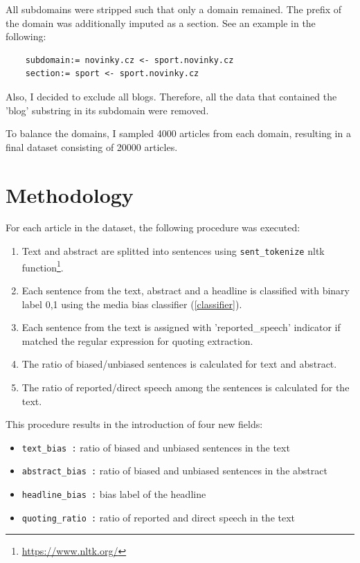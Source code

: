 All subdomains were stripped such that only a domain remained. The prefix of the domain was additionally imputed as a section. See an example in the following:
\begin{verbatim}
    subdomain:= novinky.cz <- sport.novinky.cz 
    section:= sport <- sport.novinky.cz
\end{verbatim}

Also, I decided to exclude all blogs. Therefore, all the data that contained the 'blog' substring in its subdomain were removed.

To balance the domains, I sampled 4000 articles from each domain, resulting in a final dataset consisting of 20000 articles.


\section{Methodology}
For each article in the dataset, the following procedure was executed:
\begin{enumerate}
    \item Text and abstract are splitted into sentences using \verb|sent_tokenize| nltk function\footnote{\url{https://www.nltk.org/}}.
    \item Each sentence from the text, abstract and a headline is classified with binary label 0,1 using the media bias classifier (\ref{classifier}).
    \item Each sentence from the text is assigned with 'reported\_speech' indicator if matched the regular expression for quoting extraction. 
    \item The ratio of biased/unbiased sentences is calculated for text and abstract.
    \item The ratio of reported/direct speech among the sentences is calculated for the text.
\end{enumerate}

This procedure results in the introduction of four new fields:
\begin{itemize}
    \item \verb|text_bias :| ratio of biased and unbiased sentences in the text
    \item \verb|abstract_bias :| ratio of biased and unbiased sentences in the abstract
    \item \verb|headline_bias :| bias label of the headline
    \item \verb|quoting_ratio :| ratio of reported and direct speech in the text     
\end{itemize}



